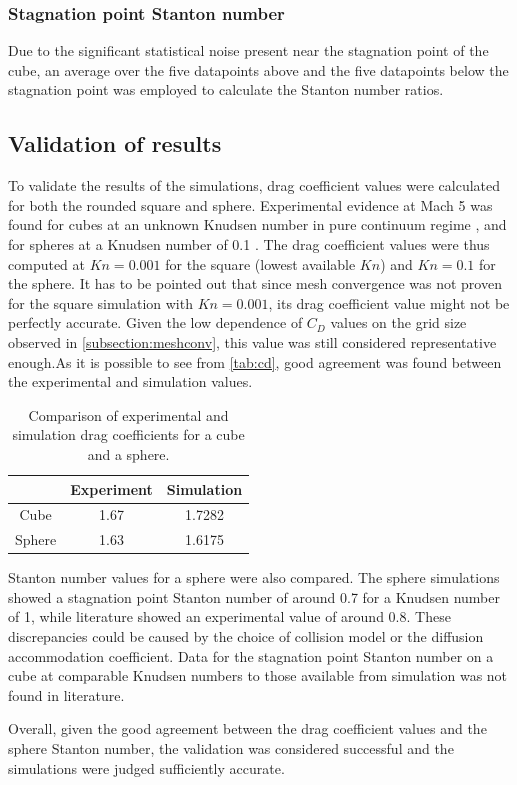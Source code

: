 \subsubsection{Stagnation point Stanton number}
Due to the significant statistical noise present near the stagnation point of the cube, an average over the five datapoints above and the five datapoints below the stagnation point was employed to calculate the Stanton number ratios.

\subsection{Validation of results}
To validate the results of the simulations, drag coefficient values were calculated for both the rounded square and sphere. Experimental evidence at Mach 5 was found for cubes at an unknown Knudsen number in pure continuum regime \cite{cubecd}, and for spheres at a Knudsen number of 0.1 \cite{spherecd}. The drag coefficient values were thus computed at $Kn = 0.001$ for the square (lowest available $Kn$) and $Kn = 0.1$ for the sphere. It has to be pointed out that since mesh convergence was not proven for the square simulation with $Kn = 0.001$, its drag coefficient value might not be perfectly accurate. Given the low dependence of $C_D$ values on the grid size observed in \ref{subsection:meshconv}, this value was still considered representative enough.As it is possible to see from \autoref{tab:cd}, good agreement was found between the experimental and simulation values.

\begin{table}[h]
    \centering
    \caption{Comparison of experimental and simulation drag coefficients for a cube and a sphere.}
    \begin{tabular}{c|cc}
        \toprule
        & Experiment & Simulation\\
        \midrule
        Cube & 1.67 & 1.7282\\
        Sphere & 1.63 & 1.6175\\
        \bottomrule
    \end{tabular}
    \label{tab:cd}
\end{table}

Stanton number values for a sphere were also compared. The sphere simulations showed a stagnation point Stanton number of around 0.7 for a Knudsen number of 1, while literature \cite{riabov} showed an experimental value of around 0.8. These discrepancies could be caused by the choice of collision model or the diffusion accommodation coefficient. Data for the stagnation point Stanton number on a cube at comparable Knudsen numbers to those available from simulation was not found in literature.

Overall, given the good agreement between the drag coefficient values and the sphere Stanton number, the validation was considered successful and the simulations were judged sufficiently accurate.



